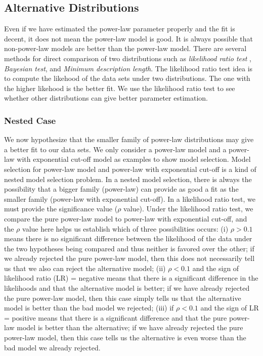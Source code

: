 \subsection{Alternative Distributions}
Even if we have estimated the power-law parameter properly and the fit is decent, it does not mean the power-law model is good.
It is always possible that non-power-law models are better than the power-law model.
There are several methods for direct comparison of two distributions such as \textit{likelihood ratio test} \cite{vuong1989likelihood}, \textit{Bayesian test}, and \textit{Minimum description length}.
The likelihood ratio test idea is to compute the likehood of the data sets under two distributions. 
The one with the higher likehood is the better fit. 
We use the likelihood ratio test to see whether other distributions can give better parameter estimation.

\subsubsection{Nested Case}
We now hypothesize that the smaller family of power-law distributions may give a better fit to our data sets.
We only consider a power-law model and a power-law with exponential cut-off model as examples to show model selection.
Model selection for power-law model and power-law with exponential cut-off is a kind of nested model selection problem.
In a nested model selection,  there is always the possibility that a bigger family (power-law) can provide as good a fit as the smaller family (power-law with exponential cut-off).
In a likelihood ratio test, we must provide the significance value ($\rho$ value).
Under the likelihood ratio test, we compare the pure power-law model to power-law with exponential cut-off, and the $\rho$ value here helps us establish which of three possibilities occurs: (i) $\rho > 0.1$ means there is no significant difference between the likelihood of the data under the two hypotheses being compared and thus neither is favored over the other; if we already rejected the pure power-law model, then this does not necessarily tell us that we also can reject the alternative model; (ii) $\rho  < 0.1$ and the sign of likelihood ratio (LR) = negative means that there is a significant difference in the likelihoods and that the alternative model is better; if we have already rejected the pure power-law model, then this case simply tells us that the alternative model is better than the bad model we rejected; (iii) if $\rho < 0.1$ and the sign of LR = positive means that there is a significant difference and that the pure power-law model is better than the alternative; if we have already rejected the pure power-law model, then this case tells us the alternative is even worse than the bad model we already rejected.


